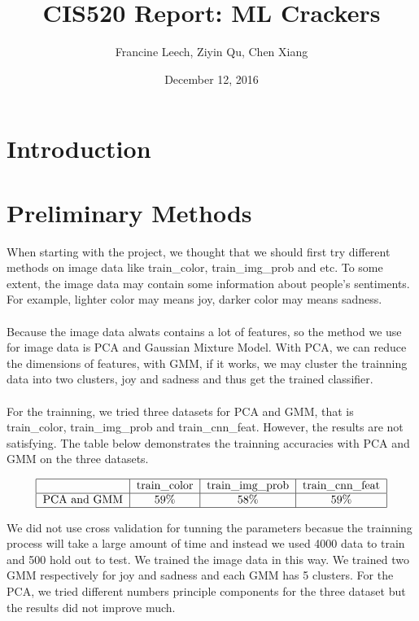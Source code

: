 \documentclass[]{article}
\begin{document}
\title{CIS520 Report: ML Crackers}   %
\author{Francine Leech, Ziyin Qu, Chen Xiang}         %
\date{December 12, 2016}    %
\maketitle

\section{Introduction}


\section{Preliminary Methods}

When starting with the project, we thought that we should first try different methods on image data like train\_color, train\_img\_prob and etc. To some extent, the image data may contain some information about people's sentiments. For example, lighter color may means joy, darker color may means sadness. \\\\

Because the image data alwats contains a lot of features, so the method we use for image data is PCA and Gaussian Mixture Model. With PCA, we can reduce the dimensions of features, with GMM, if it works, we may cluster the trainning data into two clusters, joy and sadness and thus get the trained classifier. \\\\

For the trainning, we tried three datasets for PCA and GMM, that is train\_color, train\_img\_prob and train\_cnn\_feat. However, the results are not satisfying. The table below demonstrates the trainning accuracies with PCA and GMM on the three datasets.

\[
\begin{tabular}{|c|c|c|c|}
\hline &train\_color & train\_img\_prob & train\_cnn\_feat\\
\hline PCA and GMM&59\%&58\%&59\%\\
\hline
\end{tabular}
\]

We did not use cross validation for tunning the parameters becasue the trainning process will take a large amount of time and instead we used 4000 data to train and 500 hold out to test. We trained the image data in this way. We trained two GMM respectively for joy and sadness and each GMM has 5 clusters. For the PCA, we tried different numbers principle components for the three dataset but the results did not improve much.\\\\
\end{document}
